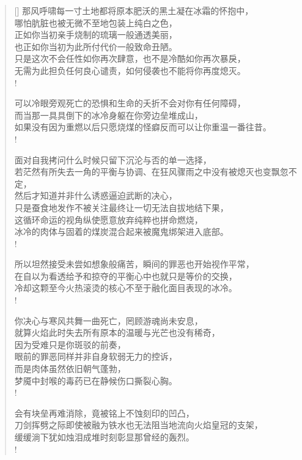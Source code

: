 \documentclass[UTF8, 12pt, a4paper]{ctexrep} %
\begin{document}
\begin{verse}[\versewidth]
那风呼啸每一寸土地都将原本肥沃的黑土凝在冰霜的怀抱中，\\
哪怕肮脏也被无微不至地包装上纯白之色，\\
正如你当初亲手烧制的琉璃一般通透美丽，\\
也正如你当初为此所付代价一般致命丑陋。\\
只是这次不会任性如你再次肆意，也不是冷酷如你再次暴戾，\\
无需为此担负任何良心谴责，如何侵袭也不能将你再度熄灭。\\!

可以冷眼旁观死亡的恐惧和生命的夭折不会对你有任何障碍，\\
而当那一具具倒下的冰冷身躯在你旁边垒堆成山，\\
如果没有因为重燃以后只愿烧煤的怪癖反而可以让你重温一番往昔。\\!

面对自我拷问什么时候只留下沉沦与否的单一选择，\\
若茫然有所失去一角的平衡与协调、在狂风骤雨之中没有被熄灭也变飘忽不定，\\
然后才知道并非什么诱惑逼迫武断的决心，\\
只是蚕食地发作不被关注最终让一切无法自拔地结下果，\\
这循环命运的视角纵使愿意放弃纯粹也拼命燃烧，\\
冰冷的肉体与固着的煤炭混合起来被魔鬼绑架进入底部。\\!

所以坦然接受未尝如想象般痛苦，瞬间的罪恶也开始视作平常，\\
在自以为看透给予和掠夺的平衡心中也就只是等价的交换，\\
冷却这颗至今火热滚烫的核心不至于融化面目表现的冰冷。\\!

你决心与寒风共舞一曲死亡，罔顾游魂尚未安息，\\
就算火焰此时失去所有原本的温暖与光芒也没有稀奇，\\
因为受难只是你斑驳的前奏，\\
眼前的罪恶同样并非自身软弱无力的控诉，\\
而是肉体虽然依旧朝气蓬勃，\\
梦魇中封喉的毒药已在静候伤口撕裂心胸。\\!

会有块垒再难消除，竟被铭上不蚀刻印的凹凸，\\
刀剑挥劈之际即使被融为铁水也无法阻当地流向火焰皇冠的支架，\\
缓缓淌下犹如烛泪成堆时刻彰显那曾经的轰烈。\\!


\end{verse}
\end{document}
